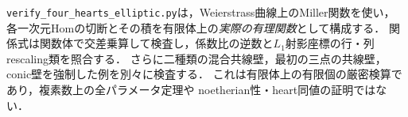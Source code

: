 \begin{remark}[検算]
\texttt{verify\_four\_hearts\_elliptic.py}は，Weierstrass曲線上のMiller関数を使い，
各一次元Homの切断とその積を有限体上の\emph{実際の有理関数}として構成する．
関係式は関数体で交差乗算して検査し，係数比の逆数と$L_1$射影座標の行・列rescaling類を照合する．
さらに二種類の混合共線壁，最初の三点の共線壁，conic壁を強制した例を別々に検査する．
これは有限体上の有限個の厳密検算であり，複素数上の全パラメータ定理や
noetherian性・heart同値の証明ではない．
\end{remark}
